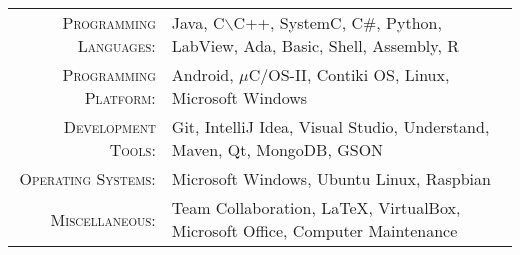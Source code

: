 %
%
%

\renewcommand{\arraystretch}{1.1}

	\begin{tabular}{>{}r>{}p{13cm}} 
		\textsc{Programming Languages:}  		&   Java, C$\backslash$C++, SystemC, C\#, Python, LabView, Ada, Basic, Shell, Assembly, R\\ 
		\textsc{Programming Platform:}          & Android, $\mu$C/OS-II, Contiki OS, Linux, Microsoft Windows\\ 
		\textsc{Development Tools:}	  		&   Git, IntelliJ Idea, Visual Studio, Understand, Maven, Qt, MongoDB, GSON\\
		\textsc{Operating Systems:}	        &   Microsoft Windows, Ubuntu Linux, Raspbian\\ 
        \textsc{Miscellaneous:}				&   Team Collaboration, \LaTeX, VirtualBox, Microsoft Office, Computer Maintenance\\
	\end{tabular}
